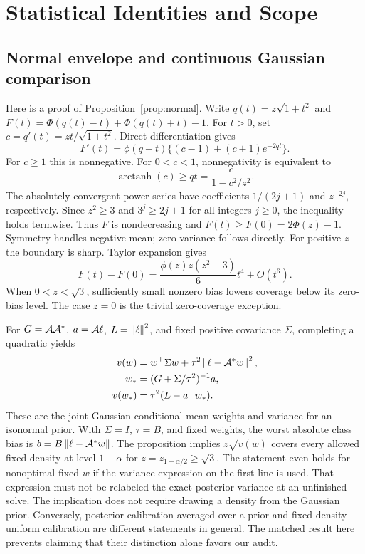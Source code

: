 \section{Statistical Identities and Scope}\label{app:proofs}
\subsection{Normal envelope and continuous Gaussian comparison}
Here is a proof of Proposition~\ref{prop:normal}. Write $q(t)=z\sqrt{1+t^2}$ and
$F(t)=\Phi(q(t)-t)+\Phi(q(t)+t)-1$. For $t>0$, set
$c=q'(t)=zt/\sqrt{1+t^2}$. Direct differentiation gives
\[
F'(t)=\phi(q-t)\{(c-1)+(c+1)e^{-2qt}\}.
\]
For $c\ge1$ this is nonnegative. For $0<c<1$, nonnegativity is equivalent to
\[
\operatorname{arctanh}(c)\ge qt=\frac{c}{1-c^2/z^2}.
\]
The absolutely convergent power series have coefficients $1/(2j+1)$ and
$z^{-2j}$, respectively. Since $z^2\ge3$ and $3^j\ge2j+1$ for all
integers $j\ge0$, the inequality holds termwise. Thus $F$ is nondecreasing
and $F(t)\ge F(0)=2\Phi(z)-1$. Symmetry handles negative mean; zero variance
follows directly. For positive $z$ the boundary is sharp. Taylor expansion gives
\[
F(t)-F(0)=\frac{\phi(z)z(z^2-3)}6t^4+O(t^6).
\]
When $0<z<\sqrt3$, sufficiently small nonzero bias lowers coverage below
its zero-bias level. The case $z=0$ is the trivial zero-coverage exception.

For $G=\mathcal A\mathcal A^*$, $a=\mathcal A\ell$, $L=\left\|\ell\right\|^2$, and fixed positive covariance
$\Sigma$, completing a quadratic yields
\begin{align}
v(w)&=w^\top\Sigma w+\tau^2\left\|\ell-\mathcal A^*w\right\|^2,\\
w_*&=(G+\Sigma/\tau^2)^{-1}a,\\
v(w_*)&=\tau^2(L-a^\top w_*).
\end{align}
These are the joint Gaussian conditional mean weights and variance for an
isonormal prior. With $\Sigma=I$, $\tau=B$, and fixed weights, the worst
absolute class bias is $b=B\left\|\ell-\mathcal A^*w\right\|$. The proposition implies
$z\sqrt{v(w)}$ covers every allowed fixed density at level $1-\alpha$ for
$z=z_{1-\alpha/2}\ge\sqrt3$. The statement even holds for nonoptimal fixed
$w$ if the variance expression on the first line is used. That expression
must not be relabeled the exact posterior variance at an unfinished solve.
The implication does not require drawing a density from the Gaussian prior.
Conversely, posterior calibration averaged over a prior and fixed-density
uniform calibration are different statements in general. The matched result
here prevents claiming that their distinction alone favors our audit.

